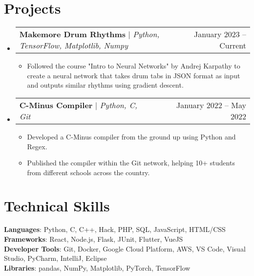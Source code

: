\documentclass[letterpaper,11pt]{article}
\makeatletter
\newcommand{\resumeItem}[1]{
  \item\small{
    {#1 \vspace{-2pt}}
  }
}
\newcommand{\resumeProjectHeading}[2]{
    \item
    \begin{tabular*}{0.97\textwidth}{l@{\extracolsep{\fill}}r}
      \small#1 & #2 \\
    \end{tabular*}\vspace{-7pt}
}
\newcommand{\resumeSubHeadingListStart}{\begin{itemize}[leftmargin=0.15in, label={}]}
\newcommand{\resumeSubHeadingListEnd}{\end{itemize}}
\newcommand{\resumeItemListStart}{\begin{itemize}}
\newcommand{\resumeItemListEnd}{\end{itemize}\vspace{-5pt}}
\makeatother
\begin{document}
\section{Projects}
    \resumeSubHeadingListStart
      \resumeProjectHeading
          {\textbf{Makemore Drum Rhythms} $|$ \emph{Python, TensorFlow, Matplotlib, Numpy}}{January 2023 -- Current}
          \resumeItemListStart
            \resumeItem{Followed the course "Intro to Neural Networks" by Andrej Karpathy to create a neural network that takes drum tabs in JSON format as input and outputs similar rhythms using gradient descent.}
          \resumeItemListEnd
      \resumeProjectHeading
          {\textbf{C-Minus Compiler} $|$ \emph{Python, C, Git}}{January 2022 -- May 2022}
          \resumeItemListStart
            \resumeItem{Developed a C-Minus compiler from the ground up using Python and Regex.}
            \resumeItem{Published the compiler within the Git network, helping 10+ students from different schools across the country.}
          \resumeItemListEnd
    \resumeSubHeadingListEnd

\section{Technical Skills}
 \begin{itemize}[leftmargin=0.15in, label={}]
    \small{\item{
     \textbf{Languages}{: Python, C, C++, Hack, PHP, SQL, JavaScript, HTML/CSS} \\
     \textbf{Frameworks}{: React, Node.js, Flask, JUnit, Flutter, VueJS} \\
     \textbf{Developer Tools}{: Git, Docker, Google Cloud Platform, AWS, VS Code, Visual Studio, PyCharm, IntelliJ, Eclipse} \\
     \textbf{Libraries}{: pandas, NumPy, Matplotlib, PyTorch, TensorFlow}
    }}
 \end{itemize}
\end{document}
